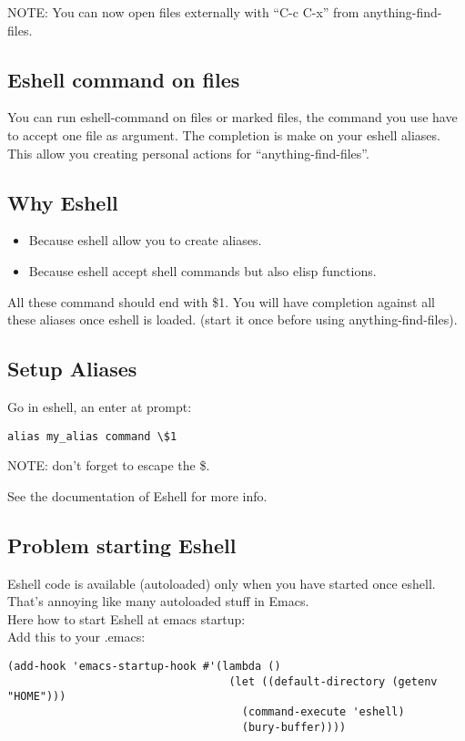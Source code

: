 \documentclass[a4paper,11pt]{article}
\begin{document}
NOTE: You can now open files externally with ``C-c C-x'' from anything-find-files.

\subsection{Eshell command on files}
\label{sec:eshell-command-files}
You can run eshell-command on files or marked files, the command you use have to accept
one file as argument.
The completion is make on your eshell aliases.
This allow you creating personal actions for ``anything-find-files''.

\subsection{Why Eshell}
\label{sec:why-eshell}
\begin{itemize}
\item Because eshell allow you to create aliases.
\end{itemize}
\begin{itemize}
\item Because eshell accept shell commands but also elisp functions.
\end{itemize}
All these command should end with \$1.
You will have completion against all these aliases once eshell is loaded.
(start it once before using anything-find-files).

\subsection{Setup Aliases}
\label{sec:setup-aliases}
Go in eshell, an enter at prompt:
\begin{verbatim}
alias my_alias command \$1
\end{verbatim}
NOTE: don't forget to escape the \$.

See the documentation of Eshell for more info.

\subsection{Problem starting Eshell}
\label{sec:probl-start-eshell}
Eshell code is available (autoloaded) only when you have started once eshell.
That's annoying like many autoloaded stuff in Emacs.\\

Here how to start Eshell at emacs startup:\\

Add this to your .emacs:
\begin{verbatim}
(add-hook 'emacs-startup-hook #'(lambda ()
                                  (let ((default-directory (getenv "HOME")))
                                    (command-execute 'eshell)
                                    (bury-buffer))))

\end{verbatim}
 
\end{document}
